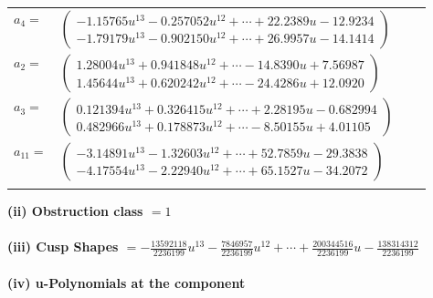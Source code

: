 \documentclass[1p]{elsarticle_modified}
\theoremstyle{definition}
\begin{document}
\begin{tabular}{m{7pt} m{180pt} m{7pt} m{180pt} }
\flushright $a_{4}=$&$\begin{pmatrix}-1.15765 u^{13}-0.257052 u^{12}+\cdots+22.2389 u-12.9234\\-1.79179 u^{13}-0.902150 u^{12}+\cdots+26.9957 u-14.1414\end{pmatrix}$ \\
\flushright $a_{2}=$&$\begin{pmatrix}1.28004 u^{13}+0.941848 u^{12}+\cdots-14.8390 u+7.56987\\1.45644 u^{13}+0.620242 u^{12}+\cdots-24.4286 u+12.0920\end{pmatrix}$ \\
\flushright $a_{3}=$&$\begin{pmatrix}0.121394 u^{13}+0.326415 u^{12}+\cdots+2.28195 u-0.682994\\0.482966 u^{13}+0.178873 u^{12}+\cdots-8.50155 u+4.01105\end{pmatrix}$ \\
\flushright $a_{11}=$&$\begin{pmatrix}-3.14891 u^{13}-1.32603 u^{12}+\cdots+52.7859 u-29.3838\\-4.17554 u^{13}-2.22940 u^{12}+\cdots+65.1527 u-34.2072\end{pmatrix}$\\&\end{tabular}
\flushleft \textbf{(ii) Obstruction class $= 1$}\\~\\
\flushleft \textbf{(iii) Cusp Shapes $= -\frac{13592118}{2236199} u^{13}-\frac{7846957}{2236199} u^{12}+\cdots+\frac{200344516}{2236199} u-\frac{138314312}{2236199}$}\\~\\
\newpage\renewcommand{\arraystretch}{1}
\flushleft \textbf{(iv) u-Polynomials at the component}\newline \\
\end{document}
